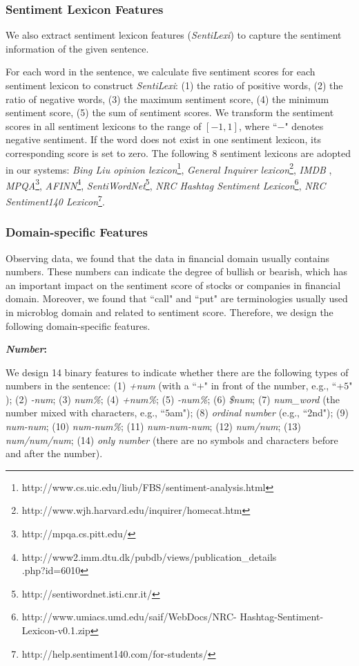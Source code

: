 \documentclass[11pt,a4paper]{article}
\begin{document}
\subsubsection{Sentiment Lexicon Features}

We also extract sentiment lexicon features (\emph{SentiLexi}) to capture the sentiment information of the given sentence.

 For each word in the sentence, we calculate five sentiment scores for each sentiment lexicon to construct \emph{SentiLexi}: (1) the ratio of positive words, (2) the ratio of negative words, (3) the maximum sentiment score, (4) the minimum sentiment score, (5) the sum of sentiment scores. We transform the sentiment scores in all sentiment lexicons to the range of $[-1,1]$, where ``$-$" denotes negative sentiment. If the word does not exist in one sentiment lexicon, its corresponding score is set to zero. The following $8$ sentiment lexicons are adopted in our systems: \emph{Bing Liu opinion lexicon}\footnote{http://www.cs.uic.edu/liub/FBS/sentiment-analysis.html}, \emph{General Inquirer lexicon}\footnote{http://www.wjh.harvard.edu/inquirer/homecat.htm},
\emph{IMDB} \cite{zhu2013ecnucs},
\emph{MPQA}\footnote{http://mpqa.cs.pitt.edu/},
\emph{AFINN}\footnote{http://www2.imm.dtu.dk/pubdb/views/publication\_details\\.php?id=6010},
\emph{SentiWordNet}\footnote{http://sentiwordnet.isti.cnr.it/},
\emph{NRC Hashtag Sentiment Lexicon}\footnote{http://www.umiacs.umd.edu/saif/WebDocs/NRC-
Hashtag-Sentiment-Lexicon-v0.1.zip},
\emph{NRC Sentiment140 Lexicon}\footnote{http://help.sentiment140.com/for-students/}.

\subsubsection{Domain-specific Features}

Observing data, we found that the data in financial domain usually contains numbers. These numbers can indicate the degree of bullish or bearish, which has an important impact on the sentiment score of stocks or companies in financial domain. Moreover, we found that ``call" and ``put" are terminologies usually used in microblog domain and related to sentiment score. Therefore, we design the following domain-specific features.

\textbf{\emph{Number}:}

We design 14 binary features to indicate whether there are the following types of numbers in the sentence: (1) \emph{+num} (with a ``$+$" in front of the number, e.g., ``+$5$" ); (2) \emph{-num}; (3) \emph{num\%}; (4) \emph{+num\%}; (5) \emph{-num\%};  (6) \emph{\$num}; (7) \emph{num\_word} (the number mixed with characters, e.g., ``$5$am"); (8) \emph{ordinal number} (e.g., ``2nd"); (9) \emph{num-num}; (10) \emph{num-num\%}; (11) \emph{num-num-num}; (12) \emph{num/num}; (13) \emph{num/num/num}; (14) \emph{only number} (there are no symbols and characters before and after the number).
\end{document}
